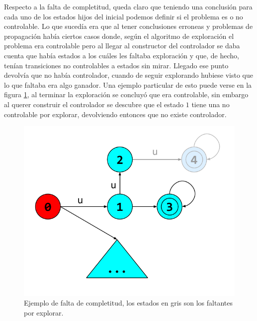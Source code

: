 Respecto a la falta de completitud, queda claro que teniendo una conclusión para cada uno de los estados hijos del inicial podemos definir si el problema es o no controlable. 
Lo que sucedía era que al tener conclusiones erroneas y problemas de propagación había ciertos casos donde, según el algoritmo de exploración el problema era controlable pero al llegar al constructor del controlador se daba cuenta que había estados a los cuáles les faltaba exploración y que, de hecho, tenían transiciones no controlables a estados sin mirar. 
Llegado ese punto devolvía que no había controlador, cuando de seguir explorando hubiese visto que lo que faltaba era algo ganador. Una ejemplo particular de esto puede verse en la figura \ref{fig:faltaCompletitud}, al terminar la exploración se concluyó que era controlable, sin embargo al querer construir el controlador se descubre que el estado $1$ tiene una no controlable por explorar, devolviendo entonces que no existe controlador. 

\begin{figure}[htb]
 \centering
 \includegraphics[width=\linewidth/2]{figures/faltaDeCompletitud.pdf}
 \caption{Ejemplo de falta de completitud, los estados en gris son los faltantes por explorar.}
 \label{fig:faltaCompletitud}
\end{figure}    

